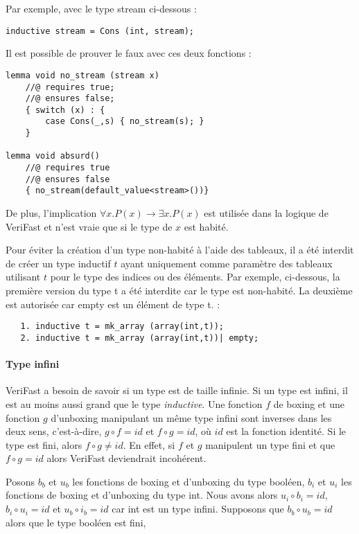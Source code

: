 \documentclass[11pt,openany]{article}
\newcommand{\verifast}{VeriFast}
\begin{document}
		Par exemple, avec le type stream ci-dessous :
\begin{lstlisting}
inductive stream = Cons (int, stream);
\end{lstlisting}
Il est possible de prouver le faux avec ces deux fonctions :
\begin{lstlisting}
lemma void no_stream (stream x)
	//@ requires true;
	//@ ensures false;
	{ switch (x) : {
		case Cons(_,s) { no_stream(s); }
	}

lemma void absurd()
	//@ requires true
	//@ ensures false
	{ no_stream(default_value<stream>())}

		\end{lstlisting}

De plus, l'implication
				$\forall x. P(x) \rightarrow \exists x. P(x)$ est utilis\'ee dans la logique de \verifast{} et n'est vraie que si le type de $x$ est habit\'e.
				
				Pour \'eviter la cr\'eation d'un type non-habit\'e \`a l'aide des tableaux, il a \'et\'e interdit de cr\'eer un type inductif $t$ ayant uniquement comme param\`etre des tableaux utilisant $t$ pour le type des indices ou des \'el\'ements. Par exemple, ci-dessous, la premi\`ere version du type t a \'et\'e interdite car le type est non-habit\'e. La deuxi\`eme est autoris\'ee car empty est un \'el\'ement de type t. :
				\begin{lstlisting}			
   1. inductive t = mk_array (array(int,t));
   2. inductive t = mk_array (array(int,t))| empty;
				\end{lstlisting}
				
			\paragraph{Type infini}
				\verifast{} a besoin de savoir si un type est de taille infinie. Si un type est infini, il est au moins aussi grand que le type \textit{inductive}. Une fonction $f$ de boxing et une fonction $g$ d'unboxing manipulant un m\^eme type infini sont inverses dans les deux sens, c'est-\`a-dire, $g\circ f = id$ et $f\circ g = id$, o\`u $id$ est la fonction identit\'e. Si le type est fini, alors $f\circ g\neq id$. En effet, si $f$ et $g$ manipulent un type fini et que $f\circ g = id$ alors \verifast{} deviendrait incoh\'erent.
				
		Posons $b_b$ et $u_b$ les fonctions de boxing et d'unboxing du type bool\'een, $b_i$ et $u_i$ les fonctions de boxing et d'unboxing du type int. Nous avons alors $u_i \circ b_i = id$, $b_i\circ u_i=id$ et $u_b\circ i_b=id$ car int est un type infini. Supposons que $b_b\circ u_b=id$ alors que le type bool\'een est fini,
		
\end{document}
